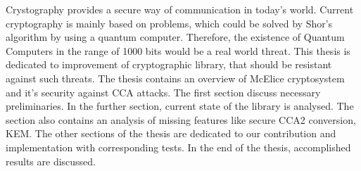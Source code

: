 Crystography provides a secure way of communication in today's world. Current cryptography is mainly based on problems, which could be solved by Shor's algorithm by using a quantum computer. Therefore, the existence of Quantum Computers in the range of 1000 bits would be a real world threat. This thesis is dedicated to improvement of cryptographic library, that should be resistant against such threats. 
The thesis contains an overview of McElice cryptosystem and it's security against CCA attacks. The first section discuss necessary preliminaries. In the further section, current state of the library is analysed. The section also contains an analysis of missing features like secure CCA2 conversion, KEM. The other sections of the thesis are dedicated to our contribution and implementation with corresponding tests. In the end of the thesis, accomplished results are discussed.